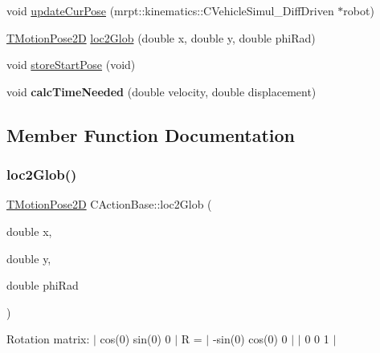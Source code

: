 \begin{DoxyCompactItemize}
void \mbox{\hyperlink{classmotion_1_1CActionBase_aed9deac73a58d2f3272403140d927988}{update\+Cur\+Pose}} (mrpt\+::kinematics\+::\+C\+Vehicle\+Simul\+\_\+\+Diff\+Driven $\ast$robot)
\item 
\mbox{\hyperlink{structmotion_1_1TMotionPose2D}{T\+Motion\+Pose2D}} \mbox{\hyperlink{classmotion_1_1CActionBase_aa8f8a1e485bd85508dc8819938d0a9a1}{loc2\+Glob}} (double x, double y, double phi\+Rad)
\item 
void \mbox{\hyperlink{classmotion_1_1CActionBase_af660bbf31c33b1932a1a5b9219334211}{store\+Start\+Pose}} (void)
\item 
\mbox{\label{classmotion_1_1CActionBase_a90058a23162d40496c60ed44578c2f69}} 
void {\bfseries calc\+Time\+Needed} (double velocity, double displacement)
\end{DoxyCompactItemize}


\subsection{Member Function Documentation}
\mbox{\label{classmotion_1_1CActionBase_aa8f8a1e485bd85508dc8819938d0a9a1}} 
\subsubsection{\texorpdfstring{loc2\+Glob()}{loc2Glob()}}
{\footnotesize\ttfamily \mbox{\hyperlink{structmotion_1_1TMotionPose2D}{T\+Motion\+Pose2D}} C\+Action\+Base\+::loc2\+Glob (\begin{DoxyParamCaption}\item[{double}]{x,  }\item[{double}]{y,  }\item[{double}]{phi\+Rad }\end{DoxyParamCaption})}

Rotation matrix\+: $\vert$ cos(0) sin(0) 0 $\vert$ R = $\vert$ -\/sin(0) cos(0) 0 $\vert$ $\vert$ 0 0 1 $\vert$\mbox{\label{classmotion_1_1CActionBase_af660bbf31c33b1932a1a5b9219334211}} 
